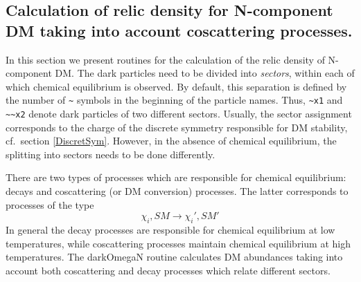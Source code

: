 \documentclass[12pt,a4paper]{article}
\begin{document}
\subsection{Calculation of relic density  for N-component DM  taking into account   coscattering processes.}

\label{sec:N}



In this section we present routines for the calculation of the relic density  of N-component DM. The dark particles  need to be divided into \emph{sectors}, within each of which chemical equilibrium is  observed.  
By default, this separation is defined by the number of \verb|~| symbols in the beginning of the 
particle names. Thus, \verb|~x1| and \verb|~~x2| denote dark particles of two different sectors. 
Usually, the sector assignment corresponds to the charge of the discrete symmetry responsible 
for DM stability, cf.\ section \ref{DiscretSym}. 
However, in the absence of chemical equilibrium, the splitting into sectors needs to be done differently. 

 There are two types of processes which are
responsible for chemical equilibrium: decays and coscattering (or DM conversion) processes. The latter
corresponds to  processes of the type 
\begin{equation}
    \chi_i, SM \to \chi_i',SM'
\end{equation}
In general the decay processes are responsible for chemical equilibrium at low
temperatures, while  coscattering processes  maintain chemical equilibrium  at high temperatures. 
The darkOmegaN routine calculates DM abundances taking into account both coscattering and decay processes
which relate different sectors.


\end{document}
